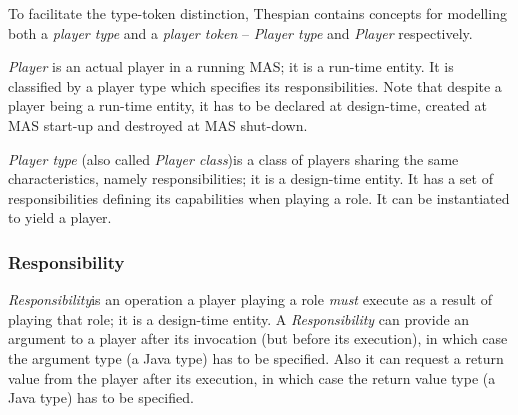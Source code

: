 To facilitate the type-token distinction, Thespian contains concepts for modelling both a \textit{player type} and a \textit{player token} -- \textit{Player type} and \textit{Player} respectively.

\textit{Player} is an actual player in a running MAS; it is a run-time entity.
It is classified by a player type which specifies its responsibilities.
Note that despite a player being a run-time entity, it has to be declared at design-time, created at MAS start-up and destroyed at MAS shut-down.

\textit{Player type} (also called \textit{Player class})is a class of players sharing the same characteristics, namely responsibilities; it is a design-time entity.
It has a set of responsibilities defining its capabilities when playing a role.
It can be instantiated to yield a player. 

\subsubsection*{Responsibility}

\textit{Responsibility}is an operation a player playing a role \textit{must} execute as a result of playing that role; it is a design-time entity. 
A \textit{Responsibility} can provide an argument to a player after its invocation (but before its execution), in which case the argument type (a Java type) has to be specified.
Also it can request a return value from the player after its execution, in which case the return value type (a Java type) has to be specified.

